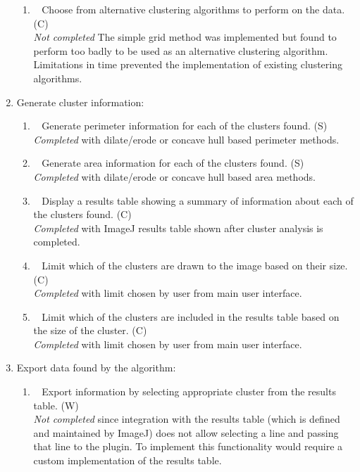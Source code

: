 \begin{enumerate}[label=\arabic*.]
\begin{enumerate}[label*=\arabic*.]
			\item~\label{req:ga} Choose from alternative clustering algorithms
				to perform on the data. (C) \\
				\emph{Not completed} The simple grid method was implemented but
				found to perform too badly to be used as an alternative
				clustering algorithm. Limitations in time prevented the
				implementation of existing clustering algorithms.

		\end{enumerate}
	\item Generate cluster information:
		\begin{enumerate}[label*=\arabic*.]
			\item~\label{req:h} Generate perimeter information for each of the
				clusters found. (S) \\
				\emph{Completed} with dilate/erode or concave hull based
				perimeter methods.

			\item~\label{req:i} Generate area information for each of the
				clusters found. (S) \\
				\emph{Completed} with dilate/erode or concave hull based area
				methods.

			\item~\label{req:j} Display a results table showing a summary of
				information about each of the clusters found. (C) \\
				\emph{Completed} with ImageJ results table shown after cluster
				analysis is completed.

			\item~\label{req:k} Limit which of the clusters are drawn to the
				image based on their size. (C) \\
				\emph{Completed} with limit chosen by user from main user
				interface.

			\item~\label{req:l} Limit which of the clusters are included in the
				results table based on the size of the cluster. (C) \\
				\emph{Completed} with limit chosen by user from main user
				interface.

		\end{enumerate}
	\item Export data found by the algorithm:
		\begin{enumerate}[label*=\arabic*.]
			\item~\label{req:m} Export information by selecting appropriate
				cluster from the results table. (W) \\
				\emph{Not completed} since integration with the results table
				(which is defined and maintained by ImageJ) does not allow
				selecting a line and passing that line to the plugin. To
				implement this functionality would require a custom
				implementation of the results table.


\end{enumerate}
\end{enumerate}
